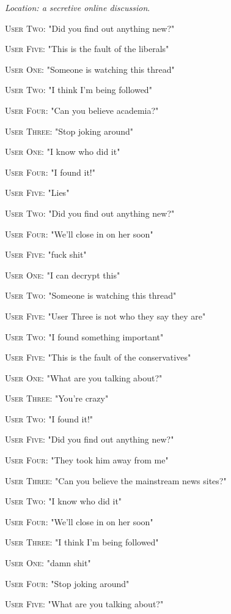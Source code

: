 \documentclass{report}
\begin{document}
\textit{Location: a secretive online discussion}. 

\textsc{User Two}: "Did you find out anything new?" 

\textsc{User Five}: "This is the fault of the liberals" 

\textsc{User One}: "Someone is watching this thread" 

\textsc{User Two}: "I think I'm being followed" 

\textsc{User Four}: "Can you believe academia?" 

\textsc{User Three}: "Stop joking around" 

\textsc{User One}: "I know who did it" 

\textsc{User Four}: "I found it!" 

\textsc{User Five}: "Lies" 

\textsc{User Two}: "Did you find out anything new?" 

\textsc{User Four}: "We'll close in on her soon" 

\textsc{User Five}: "fuck shit" 

\textsc{User One}: "I can decrypt this" 

\textsc{User Two}: "Someone is watching this thread" 

\textsc{User Five}: "User Three is not who they say they are" 

\textsc{User Two}: "I found something important" 

\textsc{User Five}: "This is the fault of the conservatives" 

\textsc{User One}: "What are you talking about?" 

\textsc{User Three}: "You're crazy" 

\textsc{User Two}: "I found it!" 

\textsc{User Five}: "Did you find out anything new?" 

\textsc{User Four}: "They took him away from me" 

\textsc{User Three}: "Can you believe the mainstream news sites?" 

\textsc{User Two}: "I know who did it" 

\textsc{User Four}: "We'll close in on her soon" 

\textsc{User Three}: "I think I'm being followed" 

\textsc{User One}: "damn shit" 

\textsc{User Four}: "Stop joking around" 

\textsc{User Five}: "What are you talking about?" 
\end{document}
